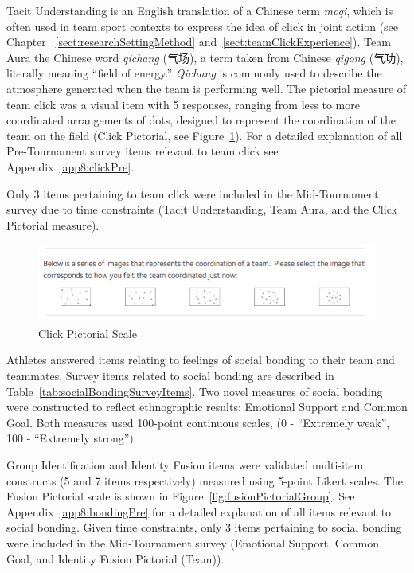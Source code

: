 \begin{CJK}{UTF8}{gbsn}
Tacit Understanding is an English translation of a Chinese term \textit{moqi}, which is often used in team sport contexts to express the idea of click in joint action (see Chapter ~\ref{sect:researchSettingMethod} and~\ref{sect:teamClickExperience}).  Team Aura the Chinese word \textit{qichang} (气场), a term taken from Chinese \textit{qigong} (气功), literally meaning ``field of energy.'' \textit{Qichang} is commonly used to describe the atmosphere generated when the team is performing well.  The pictorial measure of team click was a visual item with 5 responses, ranging from less to more coordinated arrangements of dots, designed to represent the coordination of the team on the field (Click Pictorial, see Figure~\ref{fig:clickPictorial}).
For a detailed explanation of all Pre-Tournament survey items relevant to team click see Appendix~\ref{app8:clickPre}.

Only 3 items pertaining to team click were included in the Mid-Tournament survey due to time constraints (Tacit Understanding, Team Aura, and the Click Pictorial measure).




  \begin{figure}[htbp]
    \includegraphics[width = \linewidth]{images/teamClickPictorial.png}
    \caption{Click Pictorial Scale}
    \label{fig:clickPictorial}
  \end{figure}


Athletes answered items relating to feelings of social bonding to their team and teammates.  Survey items related to social bonding are described in Table~\ref{tab:socialBondingSurveyItems}. Two novel measures of social bonding were constructed to reflect ethnographic results: Emotional Support and Common Goal.  Both measures used 100-point continuous scales, (0 - ``Extremely weak'', 100 - ``Extremely strong'').

Group Identification and Identity Fusion items were validated multi-item constructs (5 and 7 items respectively) measured using 5-point Likert scales. The Fusion Pictorial scale is shown in Figure~\ref{fig:fusionPictorialGroup}.  See Appendix~\ref{app8:bondingPre} for a detailed explanation of all items relevant to social bonding.  Given time constraints, only 3 items pertaining to social bonding were included in the Mid-Tournament survey (Emotional Support, Common Goal, and Identity Fusion Pictorial (Team)).


\end{CJK}
